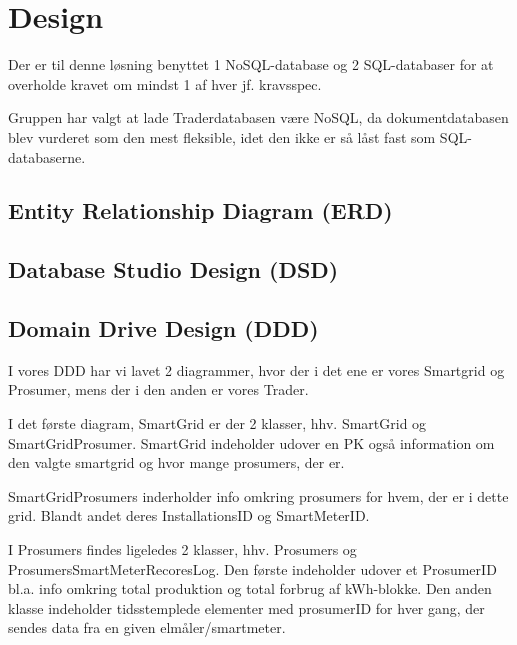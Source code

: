 
\section{Design}

Der er til denne løsning benyttet 1 NoSQL-database og 2 SQL-databaser for at overholde kravet om mindst 1 af hver jf. kravsspec.

Gruppen har valgt at lade Traderdatabasen være NoSQL, da dokumentdatabasen blev vurderet som den mest fleksible, idet den ikke er så låst fast som SQL-databaserne.

\subsection{Entity Relationship Diagram (ERD)}

\subsection{Database Studio Design (DSD)}

\subsection{Domain Drive Design (DDD)}

I vores DDD har vi lavet 2 diagrammer, hvor der i det ene er vores Smartgrid og Prosumer, mens der i  den anden er vores Trader.

I det første diagram, SmartGrid er der 2 klasser, hhv. SmartGrid og SmartGridProsumer. SmartGrid indeholder udover en PK også information om den valgte smartgrid og hvor mange prosumers, der er.

SmartGridProsumers inderholder info omkring prosumers for hvem, der er i dette grid. Blandt andet deres InstallationsID og SmartMeterID.

I Prosumers findes ligeledes 2 klasser, hhv. Prosumers og ProsumersSmartMeterRecoresLog.
Den første indeholder udover et ProsumerID bl.a. info omkring total produktion og total forbrug af kWh-blokke. Den anden klasse indeholder tidsstemplede elementer med prosumerID for hver gang, der sendes data fra en given elmåler/smartmeter.


